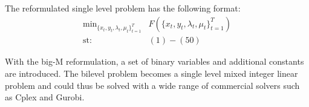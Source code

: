 The reformulated single level problem has the following format:\\
\begin{subequations}
\begin{align}
\text{min}_{\{x_t,y_t, \lambda_t, \mu_t\}^{T}_{t=1}} & F\left(\{x_t,y_t, \lambda_t, \mu_t\}^{T}_{t=1}\right)\nonumber\\
\text{st:   } & (1)-(50)\nonumber
\end{align}
\end{subequations}

With the big-M reformulation, a set of binary variables and additional constants are introduced. The bilevel problem becomes a single level mixed integer linear problem and could thus be solved with a wide range of commercial solvers such as Cplex and Gurobi. 

